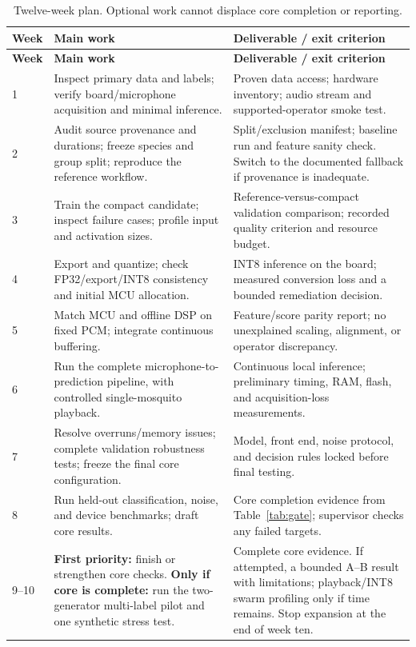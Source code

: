 \documentclass[a4paper,11pt]{article}
\begin{document}
\begin{small}
\begin{longtable}{P{1.0cm}P{7.2cm}P{7.7cm}}
\caption{Twelve-week plan. Optional work cannot displace core completion or reporting.}\label{tab:timeline}\\
\toprule\textbf{Week} & \textbf{Main work} & \textbf{Deliverable / exit criterion}\\\midrule
\endfirsthead
\toprule\textbf{Week} & \textbf{Main work} & \textbf{Deliverable / exit criterion}\\\midrule
{} & Inspect primary data and labels; verify board/microphone acquisition and minimal inference. & Proven data access; hardware inventory; audio stream and supported-operator smoke test.\\
2 & Audit source provenance and durations; freeze species and group split; reproduce the reference workflow. & Split/exclusion manifest; baseline run and feature sanity check. Switch to the documented fallback if provenance is inadequate.\\
3 & Train the compact candidate; inspect failure cases; profile input and activation sizes. & Reference-versus-compact validation comparison; recorded quality criterion and resource budget.\\
4 & Export and quantize; check FP32/export/INT8 consistency and initial MCU allocation. & INT8 inference on the board; measured conversion loss and a bounded remediation decision.\\
5 & Match MCU and offline DSP on fixed PCM; integrate continuous buffering. & Feature/score parity report; no unexplained scaling, alignment, or operator discrepancy.\\
6 & Run the complete microphone-to-prediction pipeline, with controlled single-mosquito playback. & Continuous local inference; preliminary timing, RAM, flash, and acquisition-loss measurements.\\
7 & Resolve overruns/memory issues; complete validation robustness tests; freeze the final core configuration. & Model, front end, noise protocol, and decision rules locked before final testing.\\
8 & Run held-out classification, noise, and device benchmarks; draft core results. & Core completion evidence from Table~\ref{tab:gate}; supervisor checks any failed targets.\\
9--10 & \textbf{First priority:} finish or strengthen core checks. \textbf{Only if core is complete:} run the two-generator multi-label pilot and one synthetic stress test. & Complete core evidence. If attempted, a bounded A--B result with limitations; playback/INT8 swarm profiling only if time remains. Stop expansion at the end of week ten.\\

\end{longtable}
\end{small}
\end{document}
